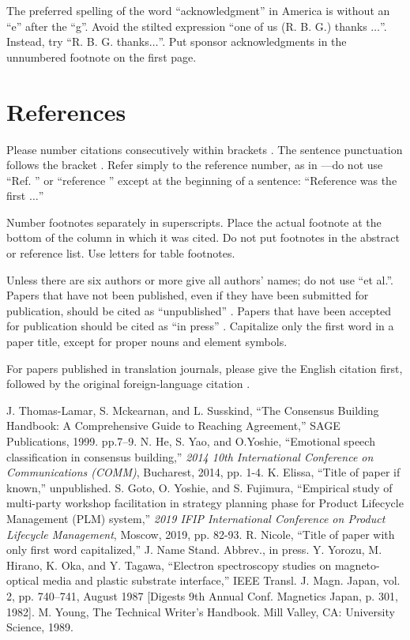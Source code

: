 \documentclass[conference]{IEEEtran}
\begin{document}
The preferred spelling of the word ``acknowledgment'' in America is without 
an ``e'' after the ``g''. Avoid the stilted expression ``one of us (R. B. 
G.) thanks $\ldots$''. Instead, try ``R. B. G. thanks$\ldots$''. Put sponsor 
acknowledgments in the unnumbered footnote on the first page.

\section*{References}

Please number citations consecutively within brackets \cite{b1}. The 
sentence punctuation follows the bracket \cite{b2}. Refer simply to the reference 
number, as in \cite{b3}---do not use ``Ref. \cite{b3}'' or ``reference \cite{b3}'' except at 
the beginning of a sentence: ``Reference \cite{b3} was the first $\ldots$''

Number footnotes separately in superscripts. Place the actual footnote at 
the bottom of the column in which it was cited. Do not put footnotes in the 
abstract or reference list. Use letters for table footnotes.

Unless there are six authors or more give all authors' names; do not use 
``et al.''. Papers that have not been published, even if they have been 
submitted for publication, should be cited as ``unpublished'' \cite{b4}. Papers 
that have been accepted for publication should be cited as ``in press'' \cite{b5}. 
Capitalize only the first word in a paper title, except for proper nouns and 
element symbols.

For papers published in translation journals, please give the English 
citation first, followed by the original foreign-language citation \cite{b6}.

\begin{thebibliography}{00}
 J. Thomas-Lamar, S. Mckearnan, and L. Susskind, ``The Consensus Building Handbook: A Comprehensive Guide to Reaching Agreement,'' SAGE Publications, 1999. pp.7--9.
 N. He, S. Yao, and O.Yoshie, ``Emotional speech classification in consensus building,'' {\it 2014 10th International Conference on Communications (COMM)}, Bucharest, 2014, pp. 1-4.
 K. Elissa, ``Title of paper if known,'' unpublished.
 S. Goto, O. Yoshie, and S. Fujimura, ``Empirical study of multi-party workshop facilitation in strategy planning phase for Product Lifecycle Management (PLM) system,'' {\it 2019 IFIP International Conference on Product Lifecycle Management}, Moscow, 2019, pp. 82-93.
 R. Nicole, ``Title of paper with only first word capitalized,'' J. Name Stand. Abbrev., in press.
 Y. Yorozu, M. Hirano, K. Oka, and Y. Tagawa, ``Electron spectroscopy studies on magneto-optical media and plastic substrate interface,'' IEEE Transl. J. Magn. Japan, vol. 2, pp. 740--741, August 1987 [Digests 9th Annual Conf. Magnetics Japan, p. 301, 1982].
 M. Young, The Technical Writer's Handbook. Mill Valley, CA: University Science, 1989.
\end{thebibliography}
\end{document}
